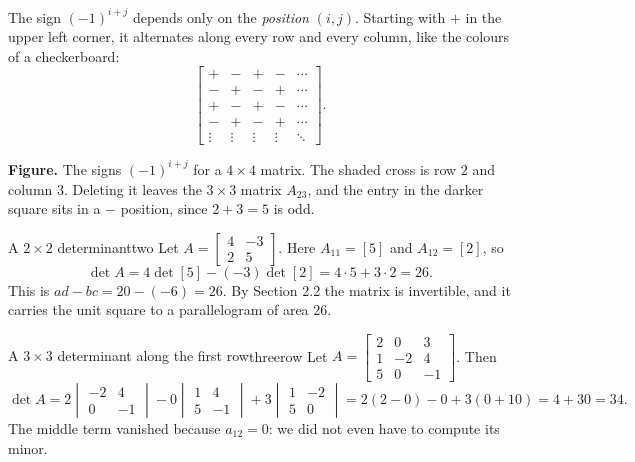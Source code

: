 \documentclass[11pt]{article}
\begin{document}
The sign $(-1)^{i+j}$ depends only on the \emph{position} $(i,j)$. Starting with $+$ in the upper left corner, it alternates along every row and every column, like the colours of a checkerboard:
\[
\begin{bmatrix}+&-&+&-&\cdots\\-&+&-&+&\cdots\\+&-&+&-&\cdots\\-&+&-&+&\cdots\\\vdots&\vdots&\vdots&\vdots&\ddots\end{bmatrix}.
\]

\begin{center}
\end{center}

\textbf{Figure.} The signs $(-1)^{i+j}$ for a $4\times4$ matrix. The shaded cross is row $2$ and column $3$. Deleting it leaves the $3\times3$ matrix $A_{23}$, and the entry in the darker square sits in a $-$ position, since $2+3=5$ is odd.

\begin{exmp}{A $2\times2$ determinant}{two}
Let $A=\begin{bmatrix}4&-3\\2&5\end{bmatrix}$. Here $A_{11}=[5]$ and $A_{12}=[2]$, so
\[
\det A=4\det[5]-(-3)\det[2]=4\cdot5+3\cdot2=26.
\]
This is $ad-bc=20-(-6)=26$. By Section 2.2 the matrix is invertible, and it carries the unit square to a parallelogram of area $26$.
\end{exmp}

\begin{exmp}{A $3\times3$ determinant along the first row}{threerow}
Let $A=\begin{bmatrix}2&0&3\\1&-2&4\\5&0&-1\end{bmatrix}$. Then
\[
\det A=2\begin{vmatrix}-2&4\\0&-1\end{vmatrix}-0\begin{vmatrix}1&4\\5&-1\end{vmatrix}+3\begin{vmatrix}1&-2\\5&0\end{vmatrix}
=2(2-0)-0+3(0+10)=4+30=34.
\]
The middle term vanished because $a_{12}=0$: we did not even have to compute its minor.
\end{exmp}
\end{document}
